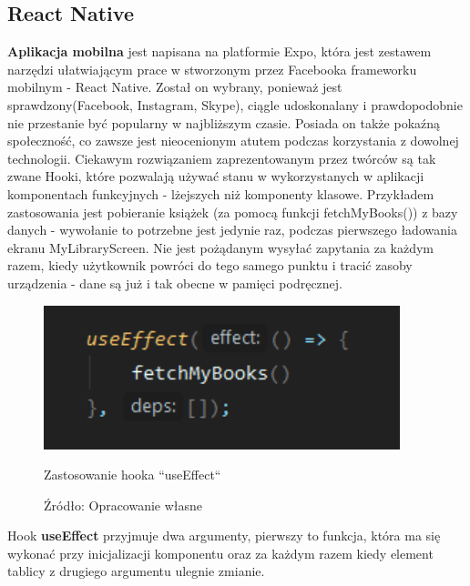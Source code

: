 \subsection{React Native}
\textbf{Aplikacja mobilna} jest napisana na platformie Expo, która jest zestawem narzędzi ułatwiającym prace w stworzonym przez Facebooka frameworku mobilnym - React Native. Został on wybrany, ponieważ jest sprawdzony(Facebook, Instagram, Skype), ciągle udoskonalany i prawdopodobnie nie przestanie być popularny w najbliższym czasie. Posiada on także pokaźną społeczność, co zawsze jest nieocenionym atutem podczas korzystania z dowolnej technologii.
Ciekawym rozwiązaniem zaprezentowanym przez twórców są tak zwane Hooki, które pozwalają używać stanu w wykorzystanych w aplikacji komponentach funkcyjnych - lżejszych niż komponenty klasowe.
Przykładem zastosowania jest pobieranie książek (za pomocą funkcji fetchMyBooks()) z bazy danych - wywołanie to potrzebne jest jedynie raz, podczas pierwszego ładowania ekranu MyLibraryScreen. Nie jest pożądanym wysyłać zapytania za każdym razem, kiedy użytkownik powróci do tego samego punktu i tracić zasoby urządzenia - dane są już i tak obecne w pamięci podręcznej. 
\begin{figure}[H]
	\centering
	\includegraphics{hook.pdf}
	\caption{Zastosowanie hooka ``useEffect``}
	\caption*{Źródło: {Opracowanie własne}}
\end{figure}
Hook \textbf{useEffect} przyjmuje dwa argumenty, pierwszy to funkcja, która ma się wykonać przy inicjalizacji komponentu oraz za każdym razem kiedy element tablicy z drugiego argumentu ulegnie zmianie.


